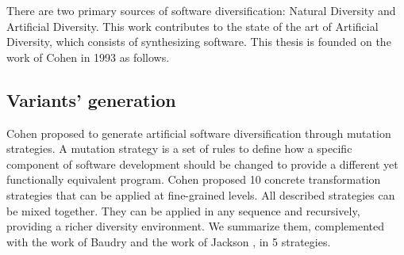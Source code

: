





There are two primary sources of software diversification: Natural Diversity and Artificial Diversity\cite{natural_diversity}. This work contributes to the state of the art of Artificial Diversity, which consists of synthesizing software. 
This thesis is founded on the work of Cohen in 1993 \cite{cohen1993operating} as follows.




\subsection{Variants' generation}
Cohen \etal proposed to generate artificial software diversification through mutation strategies.
A mutation strategy is a set of rules to define how a specific component of software development should be changed to provide a different yet functionally equivalent program. Cohen \etal proposed 10 concrete transformation strategies that can be applied at fine-grained levels. 
All described strategies can be mixed together. They can be applied in any sequence and recursively, providing a richer diversity environment. We summarize them, complemented with the work of Baudry \etal \cite{natural_diversity} and the work of Jackson \etal \cite{jackson}, in 5 strategies.



